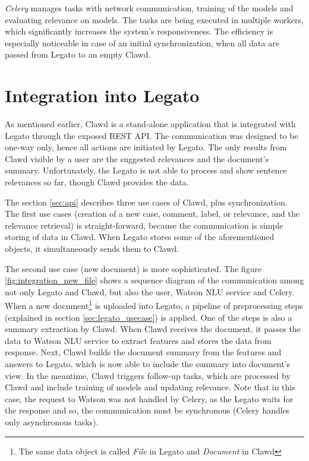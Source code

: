 \documentclass[
  digital, %
  notable,   %
  nolof,     %
  nolot,     %
  draft
]{fithesis3}
\begin{document}
\textit{Celery} manages tasks with network communication, training of the models and evaluating relevance on models.
The tasks are being executed in multiple workers, which significantly increases the system's responsiveness.
The efficiency is especially noticeable in case of an initial synchronization, when all data are passed from Legato to an empty Clawd.


\section{Integration into Legato}
As mentioned earlier, Clawd is a stand-alone application that is integrated with Legato through the exposed REST API.
The communication was designed to be one-way only, hence all actions are initiated by Legato.
The only results from Clawd visible by a user are the suggested relevances and the document's summary.
Unfortunately, the Legato is not able to process and show sentence relevances so far, though Clawd provides the data.

The section \ref{sec:api} describes three use cases of Clawd, plus synchronization.
The first use cases (creation of a new case, comment, label, or relevance, and the relevance retrieval) is straight-forward, because the communication is simple storing of data in Clawd.
When Legato stores some of the aforementioned objects, it simultaneously sends them to Clawd.

The second use case (new document) is more sophisticated.
The figure \ref{fig:integration_new_file} shows a sequence diagram of the communication among not only Legato and Clawd, but also the user, Watson NLU service and Celery.
When a new document\footnote{The same data object is called \textit{File} in Legato and \textit{Document} in Clawd} is uploaded into Legato, a pipeline of preprocessing steps (explained in section \ref{sec:legato_usecase}) is applied.
One of the steps is also a summary extraction by Clawd.
When Clawd receives the document, it passes the data to Watson NLU service to extract features and stores the data from response.
Next, Clawd builds the document summary from the features and answers to Legato, which is now able to include the summary into document's view.
In the meantime, Clawd triggers follow-up tasks, which are processed by Clawd and include training of models and updating relevance.
Note that in this case, the request to Watson was not handled by Celery, as the Legato waits for the response and so, the communication must be synchronous (Celery handles only asynchronous tasks).
\end{document}

